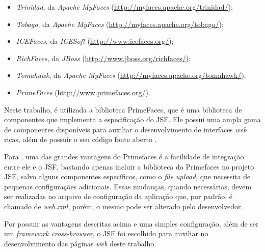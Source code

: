\begin{itemize}
	\item \textit{Trinidad}, da \textit{Apache MyFaces}
	(\url{http://myfaces.apache.org/trinidad/});
	
	\item \textit{Tobago}, da \textit{Apache MyFaces}
	(\url{http://myfaces.apache.org/tobago/});
	
	\item \textit{ICEFaces}, da \textit{ICESoft} (\url{http://www.icefaces.org/});
	
	\item \textit{RichFaces}, da \textit{JBoss}
	(\url{http://www.jboss.org/richfaces/});
	
	\item \textit{Tomahawk}, da \textit{Apache MyFaces}
	(\url{http://myfaces.apache.org/tomahawk/});
	
	\item \textit{PrimeFaces} (\url{http://www.primefaces.org/}).
\end{itemize}

\par Neste trabalho, é utilizada a biblioteca PrimeFaces, que é uma
biblioteca de componentes que implementa a especificação do JSF. Ele possui uma ampla gama de componentes disponíveis 
para auxiliar o desenvolvimento de interfaces \textit{web} ricas, além de possuir o seu
código fonte aberto \cite{ross_borsoi_uso_primefaces}.

\par Para , uma das grandes vantagens
do Primefaces é a facilidade de integração entre ele e o JSF, bastando apenas
incluir a biblioteca do Primefaces no projeto JSF, salvo alguns componentes
específicos, como o \textit{file upload}, que necessita de pequenas configurações adicionais.
Essas mudanças, quando necessárias, devem ser realizadas no arquivo de
configuração da aplicação que, por padrão, é chamado de \textit{web.xml}, porém,
o mesmo pode ser alterado pelo desenvolvedor.

\par Por possuir as vantagens descritas acima e uma simples configuração, além de ser um 
\textit{framework cross-browser\footnotemark[5]}, o JSF foi escolhido para
auxiliar no desenvolvimento das páginas \textit{web} deste trabalho.


